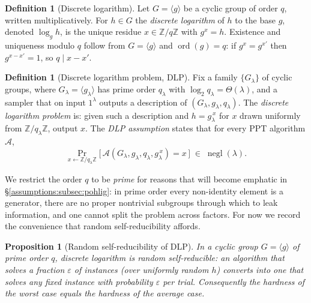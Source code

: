 \documentclass[11pt,a4paper]{article}
\newtheorem{proposition}[theorem]{Proposition}
\theoremstyle{definition}
\newtheorem{definition}[theorem]{Definition}
\theoremstyle{remark}
\newcommand{\Z}{\ensuremath{\mathbb{Z}}}
\DeclareMathOperator{\ord}{ord}
\DeclareMathOperator{\negl}{negl}
\begin{document}
\begin{definition}[Discrete logarithm]
\label{assumptions:def:dlog}
Let \(G = \langle g \rangle\) be a cyclic group of order \(q\), written multiplicatively. For \(h \in G\) the \emph{discrete logarithm} of \(h\) to the base \(g\), denoted \(\log_g h\), is the unique residue \(x \in \Z/q\Z\) with \(g^x = h\). Existence and uniqueness modulo \(q\) follow from \(G = \langle g\rangle\) and \(\ord(g) = q\): if \(g^x = g^{x'}\) then \(g^{x - x'} = 1\), so \(q \mid x - x'\).
\end{definition}

\begin{definition}[Discrete logarithm problem, DLP]
\label{assumptions:def:dlp}
Fix a family \(\{G_\lambda\}\) of cyclic groups, where \(G_\lambda = \langle g_\lambda\rangle\) has prime order \(q_\lambda\) with \(\log_2 q_\lambda = \Theta(\lambda)\), and a sampler that on input \(1^\lambda\) outputs a description of \((G_\lambda, g_\lambda, q_\lambda)\). The \emph{discrete logarithm problem} is: given such a description and \(h = g_\lambda^{\,x}\) for \(x\) drawn uniformly from \(\Z/q_\lambda\Z\), output \(x\). The \emph{DLP assumption} states that for every PPT algorithm \(\mathcal A\),
\[
\Pr_{x \leftarrow \Z/q_\lambda\Z}\!\bigl[\, \mathcal A(G_\lambda, g_\lambda, q_\lambda, g_\lambda^{\,x}) = x \,\bigr] \;\in\; \negl(\lambda).
\]
\end{definition}

We restrict the order \(q\) to be \emph{prime} for reasons that will become emphatic in \S\ref{assumptions:subsec:pohlig}: in prime order every non-identity element is a generator, there are no proper nontrivial subgroups through which to leak information, and one cannot split the problem across factors. For now we record the convenience that random self-reducibility affords.

\begin{proposition}[Random self-reducibility of DLP]
\label{assumptions:prop:rsr}
In a cyclic group \(G = \langle g\rangle\) of prime order \(q\), discrete logarithm is \emph{random self-reducible}: an algorithm that solves a fraction \(\varepsilon\) of instances (over uniformly random \(h\)) converts into one that solves \emph{any} fixed instance with probability \(\varepsilon\) per trial. Consequently the hardness of the worst case equals the hardness of the average case.
\end{proposition}
\end{document}
